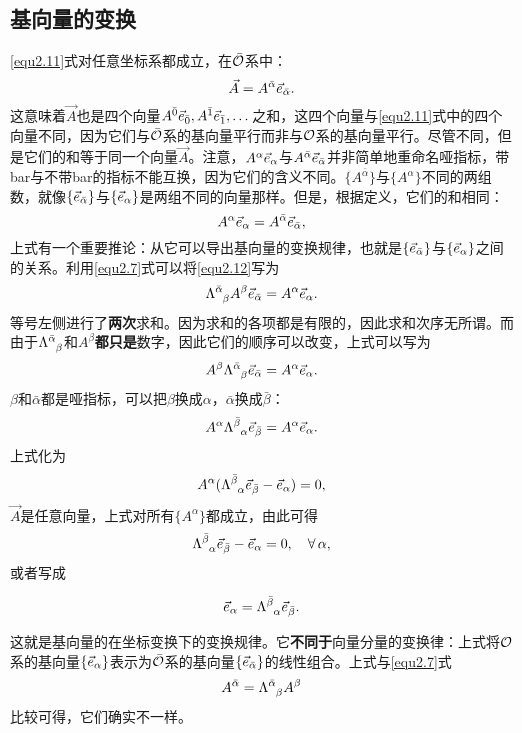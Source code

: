 \subsection*{基向量的变换}
\eqref{equ2.11}式对任意坐标系都成立，在$\bar{\mathcal{O}}$系中：
\[
    \vec{A} = A^{\bar{\alpha}} \vec{e}_{\bar{\alpha}}.
\]
这意味着$\vec{A}$也是四个向量$A^{\bar{0}} \vec{e}_{\bar{0}}, A^{\bar{1}} \vec{e}_{\bar{1}}, \dots$之和，这四个向量与\eqref{equ2.11}式中的四个向量不同，因为它们与$\bar{\mathcal{O}}$系的基向量平行而非与$\mathcal{O}$系的基向量平行。尽管不同，但是它们的和等于同一个向量$\vec{A}$。注意，$A^\alpha \vec{e}_\alpha$与$A^{\bar{\alpha}} \vec{e}_{\bar{\alpha}}$并非简单地重命名哑指标，带bar与不带bar的指标不能互换，因为它们的含义不同。$\{ A^{\bar{\alpha}}\}$与$\{ A^\alpha \}$不同的两组数，就像$\{ \vec{e}_{\bar{\alpha}} \}$与$\{ \vec{e}_\alpha \}$是两组不同的向量那样。但是，根据定义，它们的和相同：
\begin{equation}
    A^\alpha \vec{e}_\alpha = A^{\bar{\alpha}} \vec{e}_{\bar{\alpha}},
\label{equ2.12}
\end{equation}
上式有一个重要推论：从它可以导出基向量的变换规律，也就是$\{ \vec{e}_{\bar{\alpha}} \}$与$\{ \vec{e}_\alpha \}$之间的关系。利用\eqref{equ2.7}式可以将\eqref{equ2.12}写为
\[
    \Lambda\indices{^{\bar{\alpha}}_\beta} A^\beta \Ve_{\bar{\alpha}} = A^\alpha \Ve_\alpha.   
\]
等号左侧进行了\textbf{两次}求和。因为求和的各项都是有限的，因此求和次序无所谓。而由于$\Lambda\indices{^{\bar{\alpha}}_\beta}$和$A^\beta$\textbf{都只是}数字，因此它们的顺序可以改变，上式可以写为
\[
    A^\beta  \Lambda\indices{^{\bar{\alpha}}_\beta} \Ve_{\bar{\alpha}} = A^\alpha \Ve_\alpha.
\]
$\beta$和$\bar{\alpha}$都是哑指标，可以把$\beta$换成$\alpha$，$\bar{\alpha}$换成$\bar{\beta}$：
\[
    A^\alpha  \Lambda\indices{^{\bar{\beta}}_\alpha} \Ve_{\bar{\beta}} = A^\alpha \Ve_\alpha.
\]
上式化为
\[
    A^\alpha (\Lambda\indices{^{\bar{\beta}}_{\alpha}} \Ve_{\bar{\beta}} - \Ve_\alpha ) = 0,
\]
$\vec{A}$是任意向量，上式对所有$\{A^\alpha\}$都成立，由此可得
\[
    \Lambda\indices{^{\bar{\beta}}_{\alpha}} \Ve_{\bar{\beta}} - \Ve_\alpha = 0, \quad \forall\, \alpha,
\]
或者写成
\begin{shaded}
\begin{equation}
    \Ve_\alpha = \Lambda\indices{^{\bar{\beta}}_\alpha} \Ve_{\bar{\beta}}.
\label{equ2.13}
\end{equation}
\end{shaded}
这就是基向量的在坐标变换下的变换规律。它\textbf{不同于}向量分量的变换律：上式将$\mathcal{O}$系的基向量$\{ \vec{e}_\alpha \}$表示为$\bar{\mathcal{O}}$系的基向量$\{ \vec{e}_{\bar{\alpha}} \}$的线性组合。上式与\eqref{equ2.7}式
\[
    A^{\bar{\alpha}} = \Lambda\indices{^{\bar{\alpha}}_\beta} A^{\beta}
\]
比较可得，它们确实不一样。

